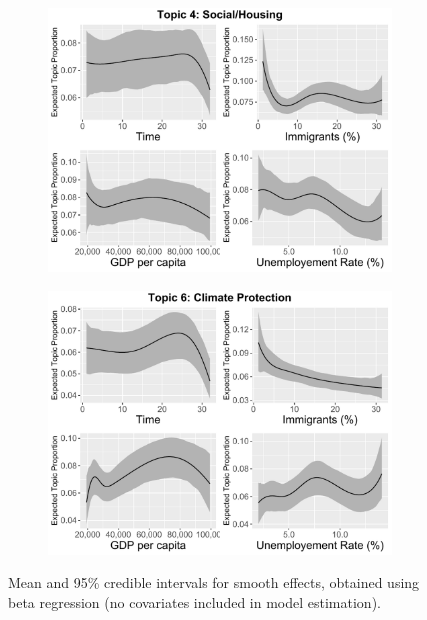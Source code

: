 \begin{figure}[h!]
  \centering
  \begin{subfigure}[b]{0.4\linewidth}
    \includegraphics[width=\linewidth]{../plots/appendix/4_6/beta_t4_cont_ctm.pdf}
  \end{subfigure}
  \begin{subfigure}[b]{0.4\linewidth}
    \includegraphics[width=\linewidth]{../plots/appendix/4_6/beta_t6_cont_ctm.pdf}
  \end{subfigure}
  \caption{Mean and 95\% credible intervals for smooth effects, obtained using beta regression (no covariates included in model estimation).}
  \label{fig:beta_t46_cont_ctm}
\end{figure}

